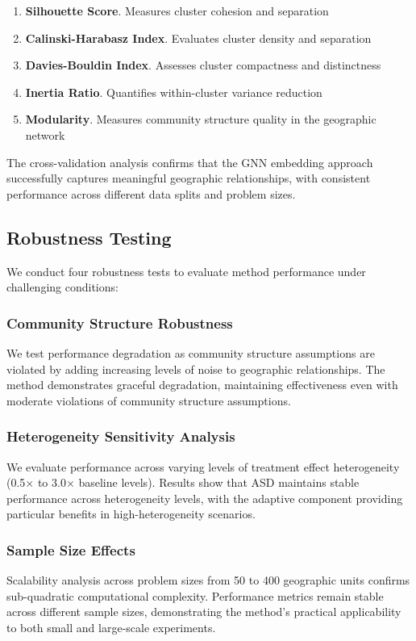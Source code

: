 \documentclass[final,3p,fleqn, 10pt]{elsarticle}
\begin{document}
\begin{enumerate}
    \item \textbf{Silhouette Score}. Measures cluster cohesion and separation
    \item \textbf{Calinski-Harabasz Index}. Evaluates cluster density and separation
    \item \textbf{Davies-Bouldin Index}. Assesses cluster compactness and distinctness
    \item \textbf{Inertia Ratio}. Quantifies within-cluster variance reduction
    \item \textbf{Modularity}. Measures community structure quality in the geographic network
\end{enumerate}

The cross-validation analysis confirms that the GNN embedding approach successfully captures meaningful geographic relationships, with consistent performance across different data splits and problem sizes.

\subsection{Robustness Testing}

We conduct four robustness tests to evaluate method performance under challenging conditions:

\subsubsection{Community Structure Robustness}
We test performance degradation as community structure assumptions are violated by adding increasing levels of noise to geographic relationships. The method demonstrates graceful degradation, maintaining effectiveness even with moderate violations of community structure assumptions.

\subsubsection{Heterogeneity Sensitivity Analysis}
We evaluate performance across varying levels of treatment effect heterogeneity (0.5× to 3.0× baseline levels). Results show that ASD maintains stable performance across heterogeneity levels, with the adaptive component providing particular benefits in high-heterogeneity scenarios.

\subsubsection{Sample Size Effects}
Scalability analysis across problem sizes from 50 to 400 geographic units confirms sub-quadratic computational complexity. Performance metrics remain stable across different sample sizes, demonstrating the method's practical applicability to both small and large-scale experiments.
\end{document}
